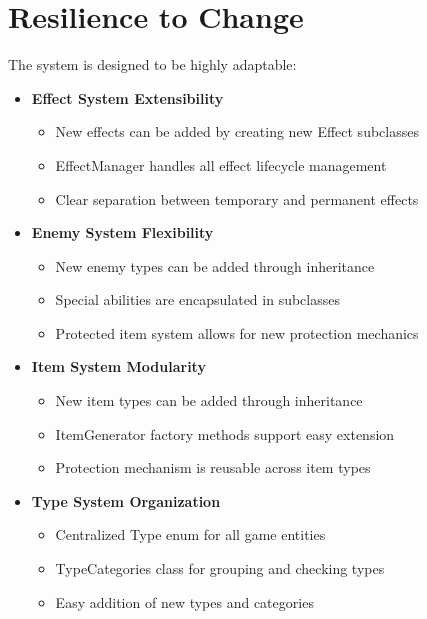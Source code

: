 \documentclass{article}
\begin{document}
\section{Resilience to Change}
The system is designed to be highly adaptable:

\begin{itemize}
    \item \textbf{Effect System Extensibility}
    \begin{itemize}
        \item New effects can be added by creating new Effect subclasses
        \item EffectManager handles all effect lifecycle management
        \item Clear separation between temporary and permanent effects
    \end{itemize}

    \item \textbf{Enemy System Flexibility}
    \begin{itemize}
        \item New enemy types can be added through inheritance
        \item Special abilities are encapsulated in subclasses
        \item Protected item system allows for new protection mechanics
    \end{itemize}

    \item \textbf{Item System Modularity}
    \begin{itemize}
        \item New item types can be added through inheritance
        \item ItemGenerator factory methods support easy extension
        \item Protection mechanism is reusable across item types
    \end{itemize}

    \item \textbf{Type System Organization}
    \begin{itemize}
        \item Centralized Type enum for all game entities
        \item TypeCategories class for grouping and checking types
        \item Easy addition of new types and categories
    \end{itemize}
\end{itemize}
\end{document}
